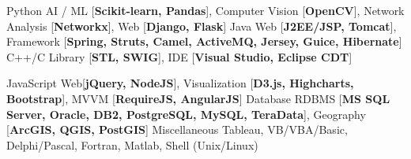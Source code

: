 \begin{cvskills}
    \cvskill
    {Python} 
    {
        AI / ML [\textbf{Scikit-learn, Pandas}], 
        Computer Vision [\textbf{OpenCV}], 
        Network Analysis [\textbf{Networkx}], 
        Web [\textbf{Django, Flask}]
    } 
    \cvskill
    {Java} %
    {
        Web [\textbf{J2EE/JSP, Tomcat}], 
        Framework [\textbf{Spring, Struts, Camel, ActiveMQ, Jersey, Guice, Hibernate}]
    } 
    \cvskill
    {C++/C} %
    {
        Library [\textbf{STL, SWIG}], 
        IDE [\textbf{Visual Studio, Eclipse CDT}]
    } 
    
    \cvskill
    {JavaScript} 
    {
        Web[\textbf{jQuery, NodeJS}], 
        Visualization [\textbf{D3.js, Highcharts, Bootstrap}], 
        MVVM [\textbf{RequireJS, AngularJS}]
    } 
    \cvskill
    {Database} 
    {
        RDBMS [\textbf{MS SQL Server, Oracle, DB2, PostgreSQL, MySQL, TeraData}], 
        Geography [\textbf{ArcGIS, QGIS, PostGIS}]
    }
    \cvskill
    {Miscellaneous} 
    {Tableau, VB/VBA/Basic, Delphi/Pascal, Fortran, Matlab, Shell (Unix/Linux)}
\end{cvskills}
 



